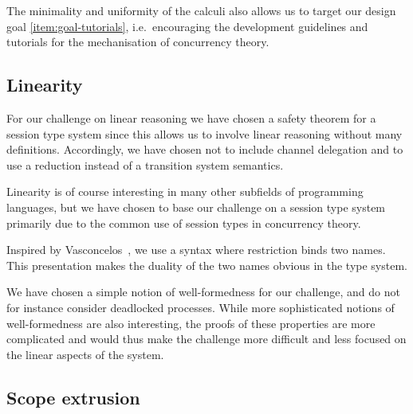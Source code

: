 \documentclass[runningheads]{llncs}
\begin{document}
The minimality and uniformity of the calculi also allows us to target our design
goal \ref{item:goal-tutorials}, i.e.~encouraging the development guidelines and
tutorials for the mechanisation of concurrency theory.



\subsection{Linearity}
%

For our challenge on linear reasoning we have chosen a safety theorem
for a session type system since this allows us to involve linear
reasoning without many definitions. Accordingly, we have chosen not to
include channel delegation and to use a reduction instead of a
transition system semantics.

Linearity is of course interesting in many other subfields of programming languages, but we have chosen to base our challenge on a session type system primarily due to the common use of session types in concurrency theory.

Inspired by Vasconcelos~\cite{Vasconcelos2012}, we use a syntax where
restriction binds two names. This presentation makes the duality
of the two names obvious in the type system.

We have chosen a simple notion of well-formedness for our challenge,
and do not for instance consider deadlocked processes. While more
sophisticated notions of well-formedness are also interesting, the
proofs of these properties are more complicated and would thus make
the challenge more difficult and less focused on the linear
aspects of the system.

\subsection{Scope extrusion}
\end{document}
